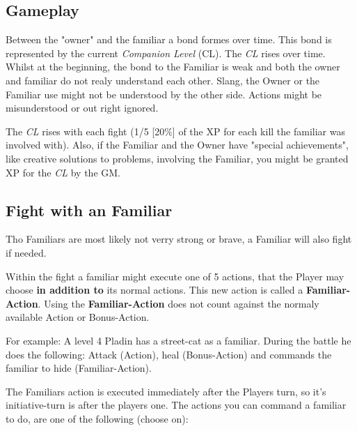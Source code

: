 \documentclass[10pt,twoside,twocolumn,openany]{book}
\begin{document}
\subsection{Gameplay}

Between the "owner" and the familiar a bond formes over time. This bond is represented by the current \textit{Companion Level} (CL). The \textit{CL} rises over time. Whilst at the beginning, the bond to the Familiar is weak and both the owner and familiar do not realy understand each other. Slang, the Owner or the Familiar use might not be understood by the other side. Actions might be misunderstood or out right ignored.

The \textit{CL} rises with each fight (1/5 [20\%] of the XP for each kill the familiar was involved with). Also, if the Familiar and the Owner have "special achievements", like creative solutions to problems, involving the Familiar, you might be granted XP for the \textit{CL} by the GM.

\newpage

\subsection{Fight with an Familiar}

Tho Familiars are most likely not verry strong or brave, a Familiar will also fight if needed.

Within the fight a familiar might execute one of 5 actions, that the Player may choose \textbf{in addition to} its normal actions. This new action is called a \textbf{Familiar-Action}.
Using the \textbf{Familiar-Action} does not count against the normaly available Action or Bonus-Action.

For example: A level 4 Pladin has a street-cat as a familiar. During the battle he does the following: Attack (Action), heal (Bonus-Action) and commands the familiar to hide (Familiar-Action).

The Familiars action is executed immediately after the Players turn, so it's initiative-turn is after the players one. The actions you can command a familiar to do, are one of the following (choose on):
\end{document}
